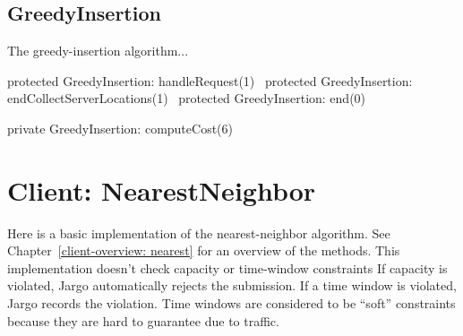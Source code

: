 \section{GreedyInsertion}
\label{client-overview: greedy}

The greedy-insertion algorithm...

\nwenddocs{}\endmoddef\nwstartdeflinemarkup{}\nwenddeflinemarkup
protected \LA{}GreedyInsertion: handleRequest(1)~{\nwtagstyle{}}\RA{}
protected \LA{}GreedyInsertion: endCollectServerLocations(1)~{\nwtagstyle{}}\RA{}
protected \LA{}GreedyInsertion: end(0)~{\nwtagstyle{}}\RA{}
\nwendcode{}\nwdocspar

\nwenddocs{}\plusendmoddef\nwstartdeflinemarkup{}\nwenddeflinemarkup
private \LA{}GreedyInsertion: computeCost(6)~{\nwtagstyle{}}\RA{}
\nwendcode{}\nwdocspar

\nwenddocs{}\chapter{Client: NearestNeighbor}
\label{client-nearest}

Here is a basic implementation of the nearest-neighbor algorithm. See
Chapter~\ref{client-overview: nearest} for an overview of the methods.  This
implementation doesn't check capacity or time-window constraints If capacity is
violated, Jargo automatically rejects the submission. If a time window is
violated, Jargo records the violation. Time windows are considered to be
``soft'' constraints because they are hard to guarantee due to traffic.

